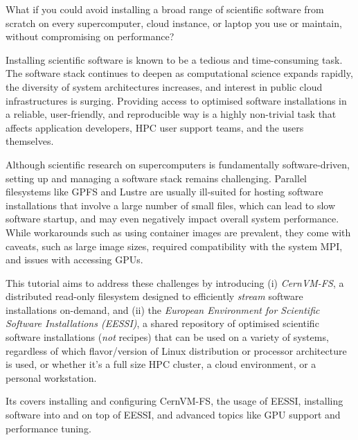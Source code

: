 What if you could avoid installing a broad range of scientific software from scratch on every
supercomputer, cloud instance, or laptop you use or maintain, without compromising on performance?

Installing scientific software is known to be a tedious and time-consuming task. The software stack
continues to deepen as computational science expands rapidly, the diversity of system architectures
increases, and interest in public cloud infrastructures is surging.
Providing access to optimised software installations in a reliable, user-friendly, and reproducible way
is a highly non-trivial task that affects application developers, HPC user support teams, and the users themselves.

Although scientific research on supercomputers is fundamentally software-driven,
setting up and managing a software stack remains challenging.
Parallel filesystems like GPFS and Lustre are usually ill-suited for hosting software installations
that involve a large number of small files, which can lead to slow software startup, and may even negatively impact
overall system performance.
While workarounds such as using container images are prevalent, they come with caveats,
such as large image sizes, required compatibility with the system MPI,
and issues with accessing GPUs.

This tutorial aims to address these challenges by introducing (i) \emph{CernVM-FS},
a distributed read-only filesystem designed to efficiently \emph{stream} software installations on-demand,
and (ii) the \emph{European Environment for Scientific Software Installations (EESSI)},
a shared repository of optimised scientific software installations (\emph{not} recipes) that can be used on a variety of
systems, regardless of which flavor/version of Linux distribution or processor architecture is used, or whether it's a full size HPC
cluster, a cloud environment, or a personal workstation.

Its covers installing and configuring CernVM-FS, the usage of EESSI,
installing software into and on top of EESSI, and advanced topics like GPU support and performance tuning.
